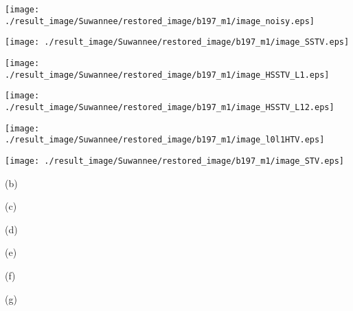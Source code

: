 \begin{figure*}[t]
	\begin{center}
		\begin{minipage}{0.150\hsize}
			\centerline{\texttt{[image: ./result\_image/Suwannee/restored\_image/b197\_m1/image\_noisy.eps]}} %
		\end{minipage}
		\begin{minipage}{0.150\hsize}
			\centerline{\texttt{[image: ./result\_image/Suwannee/restored\_image/b197\_m1/image\_SSTV.eps]}} %
		\end{minipage}
		\begin{minipage}{0.150\hsize}
			\centerline{\texttt{[image: ./result\_image/Suwannee/restored\_image/b197\_m1/image\_HSSTV\_L1.eps]}} %
		\end{minipage}
		\begin{minipage}{0.150\hsize}
			\centerline{\texttt{[image: ./result\_image/Suwannee/restored\_image/b197\_m1/image\_HSSTV\_L12.eps]}} %
		\end{minipage}
		\begin{minipage}{0.150\hsize}
			\centerline{\texttt{[image: ./result\_image/Suwannee/restored\_image/b197\_m1/image\_l0l1HTV.eps]}} %
		\end{minipage}
		\begin{minipage}{0.150\hsize}
			\centerline{\texttt{[image: ./result\_image/Suwannee/restored\_image/b197\_m1/image\_STV.eps]}} %
		\end{minipage}
		
		\vspace{1mm}
		
		\begin{minipage}{0.150\hsize}
			\centerline{\small{(b)}}
		\end{minipage}
		\begin{minipage}{0.150\hsize}
			\centerline{\small{(c)}}
		\end{minipage}
		\begin{minipage}{0.150\hsize}
			\centerline{\small{(d)}}
		\end{minipage}
		\begin{minipage}{0.150\hsize}
			\centerline{\small{(e)}}
		\end{minipage}
		\begin{minipage}{0.150\hsize}
			\centerline{\small{(f)}}
		\end{minipage}
		\begin{minipage}{0.150\hsize}
			\centerline{\small{(g)}}
		\end{minipage}
		

\end{center}
\end{figure*}
